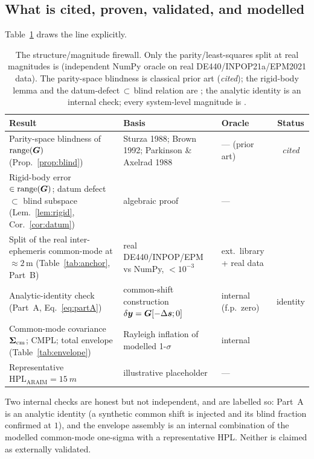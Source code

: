 \subsection{What is cited, proven, validated, and modelled}
\label{sec:matrix}

Table~\ref{tab:honesty} draws the line explicitly.

\begin{table}[t]
\centering
\caption{The structure/magnitude firewall. Only the parity/least-squares split at real
magnitudes is \Validated{} (independent NumPy oracle on real DE440/INPOP21a/EPM2021
data). The parity-space blindness is classical prior art (\emph{cited}); the rigid-body
lemma and the datum-defect$\,\subset\,$blind relation are \Proven{}; the analytic
identity is an internal check; every system-level magnitude is \Modelled{}.}
\label{tab:honesty}
\small
\begin{tabular}{@{}p{5.2cm}p{3.6cm}p{2.6cm}c@{}}
\toprule
\textbf{Result} & \textbf{Basis} & \textbf{Oracle} & \textbf{Status} \\
\midrule
Parity-space blindness of $\operatorname{range}(\bm{G})$ (Prop.~\ref{prop:blind}) &
Sturza 1988; Brown 1992; Parkinson \& Axelrad 1988 &
--- (prior art) & \emph{cited} \\[3pt]
Rigid-body error $\in\operatorname{range}(\bm{G})$; datum defect $\subset$ blind subspace
(Lem.~\ref{lem:rigid}, Cor.~\ref{cor:datum}) &
algebraic proof &
--- & \Proven{} \\[3pt]
Split of the real inter-ephemeris common-mode at $\approx\!2\,$m
(Table~\ref{tab:anchor}, Part~B) &
real DE440/INPOP/EPM vs NumPy, $<\!10^{-3}$ &
ext.\ library + real data & \Validated{} \\[3pt]
Analytic-identity check (Part~A, Eq.~\ref{eq:partA}) &
common-shift construction $\delta\bm{y}=\bm{G}[-\Delta\bm{s};0]$ &
internal (f.p.\ zero) & identity \\[3pt]
Common-mode covariance $\bm{\Sigma}_{\mathrm{cm}}$; CMPL; total envelope
(Table~\ref{tab:envelope}) &
Rayleigh inflation of modelled 1-$\sigma$ &
internal & \Modelled{} \\[3pt]
Representative $\mathrm{HPL}_{\mathrm{ARAIM}}=\SI{15}{m}$ &
illustrative placeholder &
--- & \Modelled{} \\
\bottomrule
\end{tabular}
\end{table}

Two internal checks are honest but not independent, and are labelled so: Part~A is an
analytic identity (a synthetic common shift is injected and its blind fraction confirmed
at $1$), and the envelope assembly is an internal combination of the modelled
common-mode one-sigma with a representative HPL. Neither is claimed as externally
validated.

